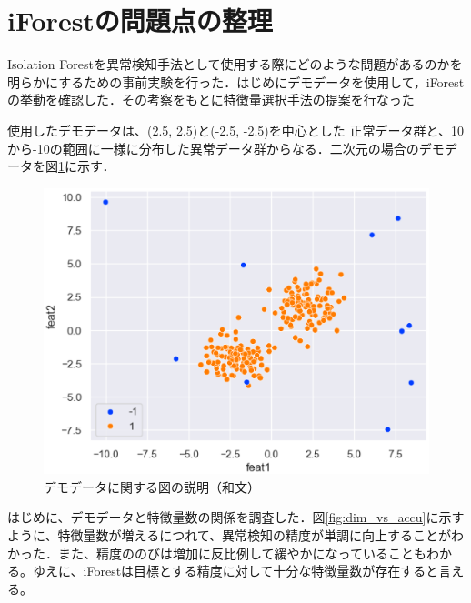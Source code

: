 \documentclass{css}
\begin{document}
\section{iForestの問題点の整理}
Isolation Forestを異常検知手法として使用する際にどのような問題があるのかを明らかにするための事前実験を行った．はじめにデモデータを使用して，iForestの挙動を確認した．その考察をもとに特徴量選択手法の提案を行なった

使用したデモデータは、(2.5, 2.5)と(-2.5, -2.5)を中心とした
正常データ群と、10から-10の範囲に一様に分布した異常データ群からなる．二次元の場合のデモデータを図\ref{fig:demodata}に示す．

\begin{figure}[tb]
    \centering
    \includegraphics[width=\linewidth]{pictures/eps/demodata.eps}
    \caption{デモデータに関する図の説明（和文）}
    \label{fig:demodata}
\end{figure}

はじめに、デモデータと特徴量数の関係を調査した．図\ref{fig:dim_vs_accu}に示すように、特徴量数が増えるにつれて、異常検知の精度が単調に向上することがわかった．また、精度ののびは増加に反比例して緩やかになっていることもわかる。ゆえに、iForestは目標とする精度に対して十分な特徴量数が存在すると言える。
\end{document}
